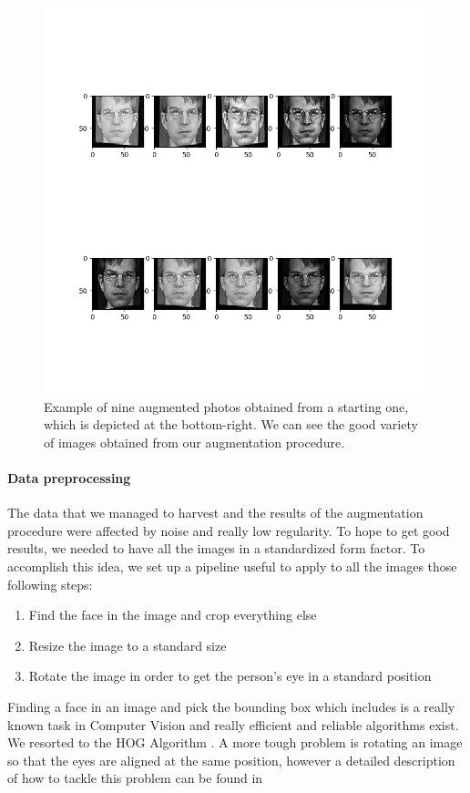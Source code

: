\begin{figure}[t]
\includegraphics[width=0.8\linewidth]{images/augmented.png}
   \caption{Example of nine augmented photos obtained from a starting one, which is depicted at the bottom-right. We can see the good variety of images obtained from our augmentation procedure.}
\label{fig:long}
\label{fig:onecol}
\end{figure}

\paragraph{Data preprocessing}
The data that we managed to harvest and the results of the augmentation procedure were affected by noise and really low regularity. To hope to get good results, we needed to have all the images in a standardized form factor. To accomplish this idea, we set up a pipeline useful to apply to all the images those following steps:

\begin{enumerate}
\item Find the face in the image and crop everything else
\item Resize the image to a standard size
\item Rotate the image in order to get the person's eye in a standard position
\end{enumerate}

Finding a face in an image and pick the bounding box which includes is a really known task in Computer Vision and really efficient and reliable algorithms exist. We resorted to the HOG Algorithm \cite{hog}. A more tough problem is rotating an image so that the eyes are aligned at the same position, however a detailed description of how to tackle this problem can be found in \cite{facealign}

